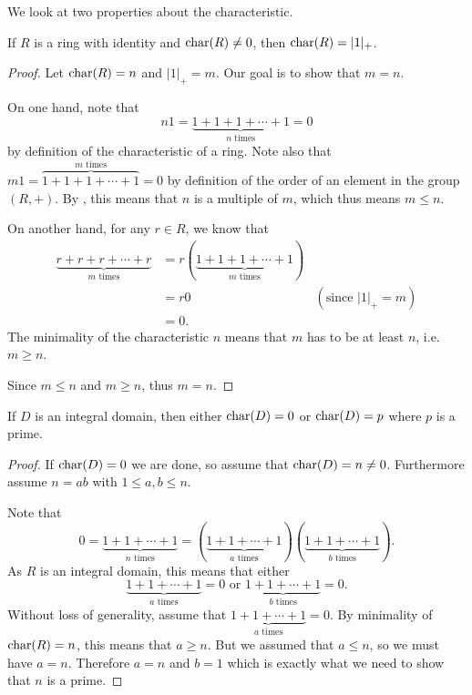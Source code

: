 We look at two properties about the characteristic.
\begin{proposition}
    If $R$ is a ring with identity and $\mathrm{char}(R) \neq 0$, then $\mathrm{char}(R) = |1|_+$.
\end{proposition}
\begin{proof}
    Let $\mathrm{char}(R) = n$ and $|1|_+ = m$. Our goal is to show that $m = n$.

    On one hand, note that
    \[
        n1 = \underbrace{1+1+1+\cdots+1}_{n \text{ times}} = 0
    \]
    by definition of the characteristic of a ring. Note also that $m1 = \overbrace{1+1+1+\cdots+1}^{m \text{ times}} = 0$ by definition of the order of an element in the group $(R, +)$. By , this means that $n$ is a multiple of $m$, which thus means $m \leq n$.

    On another hand, for any $r \in R$, we know that
    \begin{align*}
        \underbrace{r + r + r + \cdots + r}_{m \text{ times}} &= r(\underbrace{1+1+1+\cdots+1}_{m \text{ times}})\\
        &= r0 & (\text{since } |1|_+ = m)\\
        &= 0.
    \end{align*}
    The minimality of the characteristic $n$ means that $m$ has to be at least $n$, i.e. $m \geq n$.

    Since $m \leq n$ and $m \geq n$, thus $m = n$.
\end{proof}

\begin{proposition}\label{prop-zero-of-prime-characteristic-if-integral-domain}
    If $D$ is an integral domain, then either $\mathrm{char}(D) = 0$ or $\mathrm{char}(D) = p$ where $p$ is a prime.
\end{proposition}
\begin{proof}
    If $\mathrm{char}(D) = 0$ we are done, so assume that $\mathrm{char}(D) = n \neq 0$. Furthermore assume $n = ab$ with $1 \leq a,b \leq n$.

    Note that
    \[
        0 = \underbrace{1 + 1 + \cdots + 1}_{n \text{ times}} = (\underbrace{1+1+\cdots+1}_{a \text{ times}})(\underbrace{1+1+\cdots+1}_{b \text{ times}}).
    \]
    As $R$ is an integral domain, this means that either
    \[
        \underbrace{1+1+\cdots+1}_{a \text{ times}} = 0 \text{ or } \underbrace{1+1+\cdots+1}_{b \text{ times}} = 0.
    \]
    Without loss of generality, assume that $\underbrace{1+1+\cdots+1}_{a \text{ times}} = 0$. By minimality of $\mathrm{char}(R) = n$, this means that $a \geq n$. But we assumed that $a \leq n$, so we must have $a = n$. Therefore $a = n$ and $b = 1$ which is exactly what we need to show that $n$ is a prime.
\end{proof}

